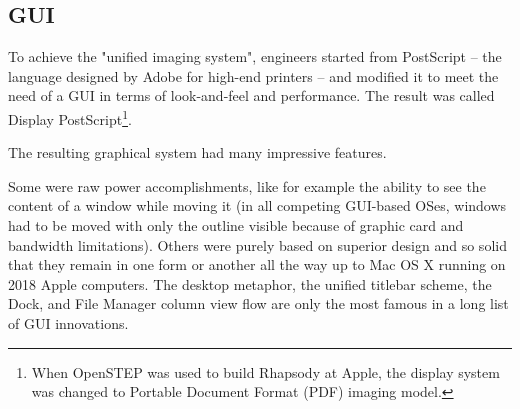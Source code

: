 \subsection{GUI}
 To achieve the "unified imaging system", \NeXT engineers started from PostScript -- the language designed by Adobe for high-end printers -- and modified it to meet the need of a GUI in terms of look-and-feel and performance. The result was called Display PostScript\footnote{When OpenSTEP was used to build Rhapsody at Apple, the display system was changed to Portable Document Format (PDF) imaging model.}.\\
\par
{}
\par
The resulting graphical system had many impressive features.\\
\par
 Some were raw power accomplishments, like for example the ability to see the content of a window while moving it (in all competing GUI-based OSes, windows had to be moved with only the outline visible because of graphic card and bandwidth limitations). Others were purely based on superior design and so solid that they remain in one form or another all the way up to Mac OS X running on 2018 Apple computers. The desktop metaphor, the unified titlebar scheme, the Dock, and File Manager column view flow are only the most famous in a long list of GUI innovations.





